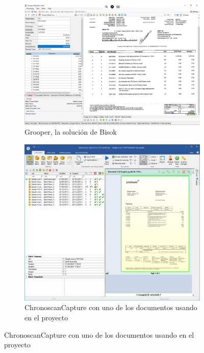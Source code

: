 \begin{figure}
    \centering
    \begin{subfigure}[b]{0.9\textwidth}
        \centering
        \includegraphics[width=\textwidth]{imaxes/b-estado-arte/bisok-grooper}
        \caption{Grooper, la solución de Bisok}
        \label{fig:grooper-bisok}
    \end{subfigure}
    \begin{subfigure}[b]{0.8\textwidth}
        \centering
        \includegraphics[width=\textwidth]{imaxes/b-estado-arte/chronoscan-capture}
        \caption{ChronoscanCapture con uno de los documentos usando en el proyecto}
        \label{fig:chronoscan-capture}
    \end{subfigure}
\end{figure}